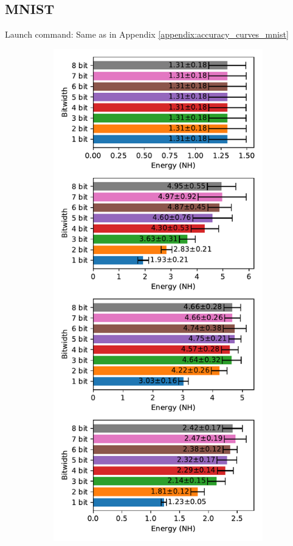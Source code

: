     \subsection{MNIST}
    \label{appendix:energy_neuromorphic_mnist}
        Launch command: Same as in Appendix \ref{appendix:accuracy_curves_mnist}

        \begin{figure}[H]
            \centering
            \begin{subfigure}[H]{0.495\textwidth}
                \includegraphics[width=\textwidth]{../standard/MNIST/plots/mnist_test_energy_nh.pdf}

\end{subfigure}
\end{figure}
